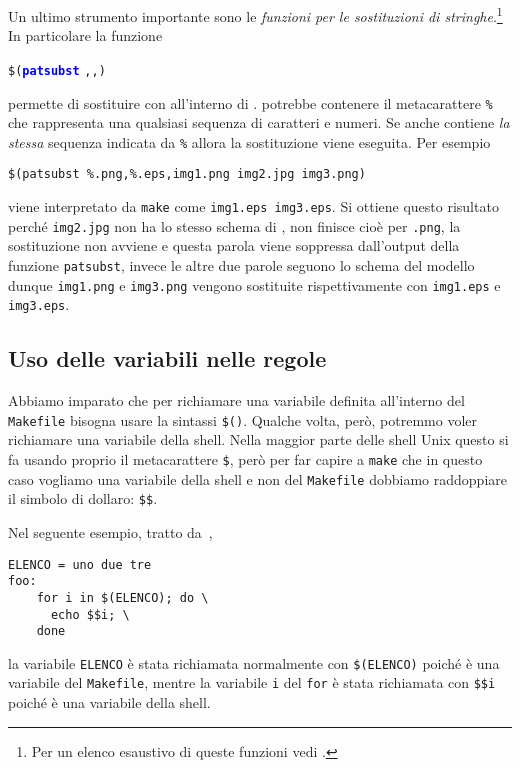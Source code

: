 Un ultimo strumento importante sono le
\emph{funzioni per le sostituzioni di
  stringhe}.\footnote{Per
  un elenco esaustivo di queste funzioni vedi \cite[pagina 80]{gnu:make}.}
In particolare la funzione
\begin{sintassi}
  \small \texttt{\$(\textcolor{blue}{\textbf{patsubst}}}
  \texttt{,}\texttt{,}\texttt{)}
\end{sintassi}
permette di sostituire  con  all'interno di
.   potrebbe contenere il metacarattere \texttt{\%}
che rappresenta una qualsiasi sequenza di caratteri e numeri.  Se anche
 contiene \emph{la stessa} sequenza indicata da \texttt{\%}
allora la sostituzione viene eseguita.  Per esempio
\begin{lstlisting}
$(patsubst %.png,%.eps,img1.png img2.jpg img3.png)
\end{lstlisting} %
viene interpretato da \texttt{make} come \texttt{img1.eps img3.eps}.  Si ottiene
questo risultato perché \texttt{img2.jpg} non ha lo stesso schema di
, non finisce cioè per \texttt{.png}, la sostituzione non avviene
e questa parola viene soppressa dall'output della funzione \texttt{patsubst},
invece le altre due parole seguono lo schema del modello dunque
\texttt{img1.png} e \texttt{img3.png} vengono sostituite rispettivamente con
\texttt{img1.eps} e \texttt{img3.eps}.

\subsection{Uso delle variabili nelle regole}
\label{sec:uso-variabili}

Abbiamo imparato che per richiamare una variabile definita all'interno del
\texttt{Makefile} bisogna usare la sintassi
\texttt{\$(}\texttt{)}.  Qualche volta, però,
potremmo voler richiamare una variabile della shell.  Nella maggior parte delle
shell Unix questo si fa usando proprio il metacarattere \texttt{\$}, però per
far capire a \texttt{make} che in questo caso vogliamo una variabile della shell
e non del \texttt{Makefile} dobbiamo raddoppiare il simbolo di dollaro:
\texttt{\$\$}.

Nel seguente esempio, tratto da~\cite[pagina 43]{gnu:make},
\begin{lstlisting}
ELENCO = uno due tre
foo:
	for i in $(ELENCO); do \
	  echo $$i; \
	done
\end{lstlisting}
la variabile \texttt{ELENCO} è stata richiamata normalmente con
\texttt{\$(ELENCO)} poiché è una variabile del \texttt{Makefile}, mentre la
variabile \texttt{i} del \texttt{for} è stata richiamata con \texttt{\$\$i}
poiché è una variabile della shell.

